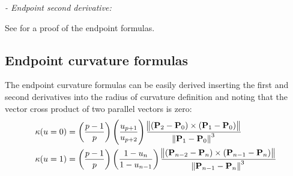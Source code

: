 \textit{- Endpoint second derivative:} \\

See \textcite[pp.~81--100]{NURBS_book} for a proof of the endpoint formulas.  


\subsection{Endpoint curvature formulas}
The endpoint curvature formulas can be easily derived inserting the first and second derivatives into the radius of curvature definition and noting that the vector cross product of two parallel vectors is zero:
\begin{align}
    \label{eq:bspline_curvature_u0}
    \kappa(u=0) &=  \left( \frac{p-1}{p}  \right)  \left( \frac{u_{p+1}}{u_{p+2}}  \right) 
    \frac{\norm{ \left(\mathbf{P}_{2}-\mathbf{P}_{0}\right) \times \left(\mathbf{P}_{1}-\mathbf{P}_{0}\right)} }{\norm{\mathbf{P}_{1}-\mathbf{P}_{0}}^3} \\
    \kappa(u=1) &=  \left( \frac{p-1}{p}  \right)  \left( \frac{1-u_{n}}{1-u_{n-1}}  \right)
    \frac{\norm{ \left(\mathbf{P}_{n-2}-\mathbf{P}_{n}\right) \times \left(\mathbf{P}_{n-1}-\mathbf{P}_{n}\right)} }{\norm{\mathbf{P}_{n-1}-\mathbf{P}_{n}}^3}
        \label{eq:bspline_curvature_u1}
\end{align}

